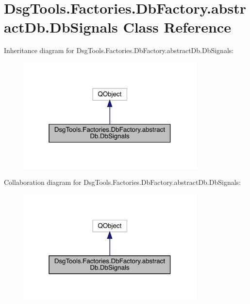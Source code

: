 \hypertarget{class_dsg_tools_1_1_factories_1_1_db_factory_1_1abstract_db_1_1_db_signals}{}\section{Dsg\+Tools.\+Factories.\+Db\+Factory.\+abstract\+Db.\+Db\+Signals Class Reference}
\label{class_dsg_tools_1_1_factories_1_1_db_factory_1_1abstract_db_1_1_db_signals}


Inheritance diagram for Dsg\+Tools.\+Factories.\+Db\+Factory.\+abstract\+Db.\+Db\+Signals\+:
\nopagebreak
\begin{figure}[H]
\begin{center}
\leavevmode
\includegraphics[width=268pt]{class_dsg_tools_1_1_factories_1_1_db_factory_1_1abstract_db_1_1_db_signals__inherit__graph}
\end{center}
\end{figure}


Collaboration diagram for Dsg\+Tools.\+Factories.\+Db\+Factory.\+abstract\+Db.\+Db\+Signals\+:
\nopagebreak
\begin{figure}[H]
\begin{center}
\leavevmode
\includegraphics[width=268pt]{class_dsg_tools_1_1_factories_1_1_db_factory_1_1abstract_db_1_1_db_signals__coll__graph}
\end{center}
\end{figure}

